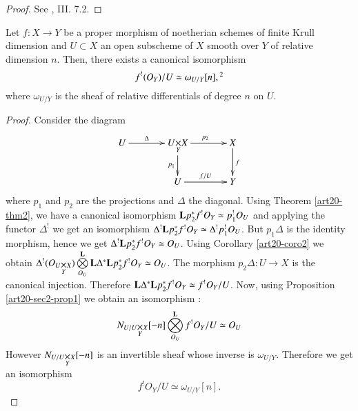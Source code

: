 \begin{proof}
See \cite{art20-key1}, III. 7.2.
\end{proof}

\begin{theorem}\label{art20-thm3}
Let $f:X\to Y$ be a proper morphism of noetherian schemes of finite Krull dimension and $U\subset X$ an open subscheme of $X$ smooth over $Y$ of relative dimension $n$. Then, there exists a canonical isomorphism
$$
f^{!}(O_{Y})/U\simeq \omega_{U/Y}[n],\footnotemark[2]
$$
where $\omega_{U/Y}$ is the sheaf of relative differentials of degree $n$ on $U$.
\end{theorem}

\begin{proof}
Consider the diagram
\[
\xymatrix@C=1.3cm{
U\ar[r]^-{\Delta} & \fprod{U}{X}{Y}\ar[d]_-{p_{1}}\ar[r]^{p_{2}} & X\ar[d]^{f}\\
 & U\ar[r]^-{f/U} & Y
}
\]\pageoriginale
where $p_{1}$ and $p_{2}$ are the projections and $\Delta$ the diagonal. Using Theorem \ref{art20-thm2}, we have a canonical isomorphism $\mathbf{L} p^{*}_{2}f^{!}O_{Y}\simeq p^{!}_{1}O_{U}$ and applying the functor $\Delta^{!}$ we get an isomorphism $\Delta^{!}\mathbf{L} p^{*}_{2}f^{!}O_{Y}\simeq \Delta^{!}p^{!}_{1}O_{U}$. But $p_{1}\Delta$ is the identity morphism, hence we get $\Delta^{!}\mathbf{L} p^{*}_{2}f^{!}O_{Y}\simeq O_{U}$. Using Corollary \ref{art20-coro2} we obtain $\Delta^{!}(O_{\fprod{U}{X}{Y}})\bigotimes\limits^{\bfL}_{O_{U}}\bfL\Delta^{*}\bfL p^{*}_{2}f^{!}O_{Y}\simeq O_{U}$. The morphism $p_{2}\Delta  : U\to X$ is the canonical injection. Therefore $\mathbf{L} \Delta^{*}\mathbf{L} p^{*}_{2}f^{!}O_{Y}\simeq f^{!}O_{Y}/U$. Now, using Proposition \ref{art20-sec2-prop1} we obtain an isomorphism :
$$
N_{\fprod{U/U}{X}{Y}}[-n]\bigotimes\limits^{\bfL}_{O_{U}}f^{!}O_{Y}/U\simeq O_{U}
$$
However $N_{\fprod{U/U}{X}{Y}}[-n]$ is an invertible sheaf whose inverse is $\omega_{U/Y}$. Therefore we get an isomorphism
$$
f^{!}O_{Y}/U\simeq \omega_{U/Y}[n].
$$


\end{proof}
